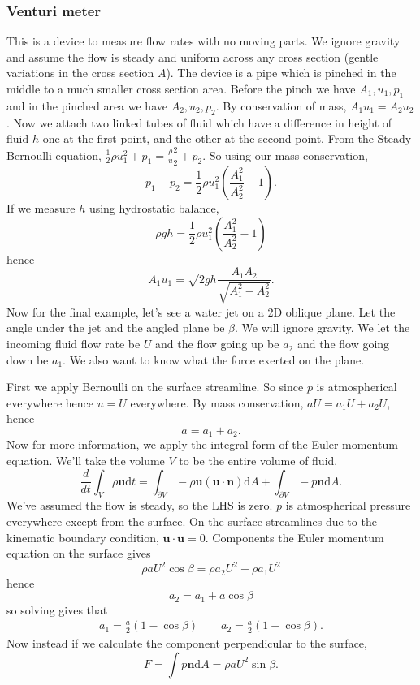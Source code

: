 \documentclass{article}
\begin{document}
\subsubsection{Venturi meter}
This is a device to measure flow rates with no moving parts. We ignore gravity and assume the flow is steady and uniform across any cross section (gentle variations in the cross section $ A $). The device is a pipe which is pinched in the middle to a much smaller cross section area. Before the pinch we have $ A_1,u_1,p_1 $ and in the pinched area we have $ A_2,u_2,p_2 $. By conservation of mass, $ A_1u_1=A_2u_2 $. Now we attach two linked tubes of fluid which have a difference in height of fluid $ h $ one at the first point, and the other at the second point. From the Steady Bernoulli equation, $ \frac 12 \rho u_1^2 + p_1 = \frac \rho u_2^2 + p_2 $. So using our mass conservation,
\[
	p_1-p_2 = \frac 12 \rho u_1^2\left(\frac{A_1^2}{A_2^2} -1\right).
\]
If we measure $ h $ using hydrostatic balance,
\[
	\rho gh = \frac 12 \rho u_1^2 \left(\frac{A_1^2}{A_2^2} - 1\right)
\]
hence
\[
	A_1u_1 = \sqrt{2gh}\frac{A_1A_2}{\sqrt{A_1^2 -A_2^2}}.
\]
Now for the final example, let's see a water jet on a 2D oblique plane. Let the angle under the jet and the angled plane be $ \beta $. We will ignore gravity. We let the incoming fluid flow rate be $ U $ and the flow going up be $ a_2 $ and the flow going down be $ a_1 $. We also want to know what the force exerted on the plane.\par
First we apply Bernoulli on the surface streamline. So since $ p $ is atmospherical everywhere  hence $ u = U $ everywhere. By mass conservation, $ aU = a_1 U + a_2 U $, hence
\[
  a = a_1 + a_2.
\]
Now for more information, we apply the integral form of the Euler momentum equation. We'll take the volume $ V $ to be the entire volume of fluid.
\[
	\frac d{dt} \int_V\rho \mathbf u \mathrm dt = \int_{\partial V} -\rho \mathbf u (\mathbf u \cdot\mathbf n )\mathrm dA + \int_{\partial V} -p \mathbf n\mathrm dA.
\]
We've assumed the flow is steady, so the LHS is zero. $ p $ is atmospherical pressure everywhere except from the surface. On the surface streamlines due to the kinematic boundary condition, $ \mathbf u \cdot\mathbf u = 0 $. Components the Euler momentum equation on the surface gives
\[
	\rho a U^2\cos\beta = \rho a_2 U^2 - \rho a_1 U^2
\]
hence
\[a_2 = a_1 + a\cos\beta \]
so solving gives that
\begin{align*}
  a_1 = \frac a2(1-\cos\beta) \qquad a_2 = \frac a2(1+\cos\beta).
\end{align*}
Now instead if we calculate the component perpendicular to the surface,
\[
  F = \int p\mathbf n \mathrm dA = \rho a U^2\sin\beta.
\]
\end{document}
